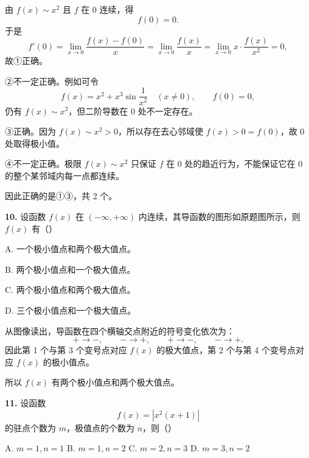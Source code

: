 \begin{solutionblock}
由 \(f(x)\sim x^2\) 且 \(f\) 在 0 连续，得
\[
f(0)=0.
\]
于是
\[
f'(0)=\lim_{x\to0}\frac{f(x)-f(0)}x
=\lim_{x\to0}\frac{f(x)}x
=\lim_{x\to0}x\cdot\frac{f(x)}{x^2}=0,
\]
故①正确。

②不一定正确。例如可令
\[
f(x)=x^2+x^3\sin\frac1{x^2}\quad(x\ne0),\qquad f(0)=0,
\]
仍有 \(f(x)\sim x^2\)，但二阶导数在 0 处不一定存在。

③正确。因为 \(f(x)\sim x^2>0\)，所以存在去心邻域使 \(f(x)>0=f(0)\)，故 0 处取得极小值。

④不一定正确。极限 \(f(x)\sim x^2\) 只保证 \(f\) 在 0 处的趋近行为，不能保证它在 0 的整个某邻域内每一点都连续。

因此正确的是①③，共 2 个。

\end{solutionblock}

\begin{problemblock}
\textbf{10.} 设函数 \(f(x)\) 在 \((-\infty,+\infty)\) 内连续，其导函数的图形如原题图所示，则 \(f(x)\) 有（\quad）

A. 一个极小值点和两个极大值点。

B. 两个极小值点和一个极大值点。

C. 两个极小值点和两个极大值点。

D. 三个极小值点和一个极大值点。
\end{problemblock}

\begin{solutionblock}
从图像读出，导函数在四个横轴交点附近的符号变化依次为：
\[
+\to-,
\qquad
-\to+,
\qquad
+\to-,
\qquad
-\to+.
\]
因此第 1 个与第 3 个变号点对应 \(f(x)\) 的极大值点，第 2 个与第 4 个变号点对应 \(f(x)\) 的极小值点。

所以 \(f(x)\) 有两个极小值点和两个极大值点。

\end{solutionblock}

\begin{problemblock}
\textbf{11.} 设函数
\[
f(x)=|x^2(x+1)|
\]
的驻点个数为 \(m\)，极值点的个数为 \(n\)，则（\quad）

A. \(m=1,n=1\) \qquad B. \(m=1,n=2\) \qquad C. \(m=2,n=3\) \qquad D. \(m=3,n=2\)
\end{problemblock}

